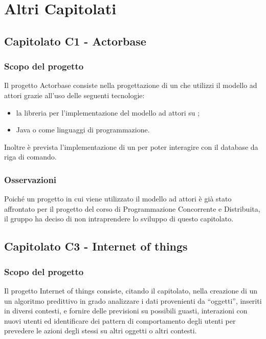 \section{Altri Capitolati}

\subsection{Capitolato C1 - Actorbase}
\subsubsection{Scopo del progetto}

Il progetto Actorbase consiste nella progettazione di un  che utilizzi il modello ad attori grazie all'uso delle seguenti tecnologie:
\begin{itemize}
	\item la libreria  per l'implementazione del modello ad attori su ;
	\item Java o  come linguaggi di programmazione.
\end{itemize}
Inoltre è prevista l'implementazione di un  per poter interagire con il database da riga di comando.

\subsubsection{Osservazioni}
Poiché un progetto in cui viene utilizzato il modello ad attori è già stato affrontato per il progetto del corso di Programmazione Concorrente e Distribuita, il gruppo ha deciso di non intraprendere lo sviluppo di questo capitolato.


\subsection{Capitolato C3 - Internet of things}
\subsubsection{Scopo del progetto}

Il progetto Internet of things consiste, citando il capitolato, nella creazione di un un algoritmo predittivo in grado analizzare i dati provenienti da “oggetti”, inseriti in diversi contesti, e fornire delle previsioni su possibili guasti, interazioni con nuovi utenti ed identificare dei pattern di comportamento degli utenti per prevedere le azioni degli stessi su altri oggetti o altri contesti.

